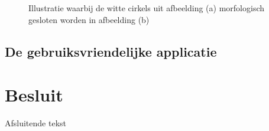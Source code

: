 \documentclass[a4paper,kulak]{kulakarticle}
\begin{document}
\begin{figure}[H]
	\centering
	\qquad
	
	\caption{Illustratie waarbij de witte cirkels uit afbeelding (a) morfologisch gesloten worden in afbeelding (b)}
	\label{figuur morf}
\end{figure}

\subsection{De gebruiksvriendelijke applicatie}

\section*{Besluit}

Afsluitende tekst
\end{document}
